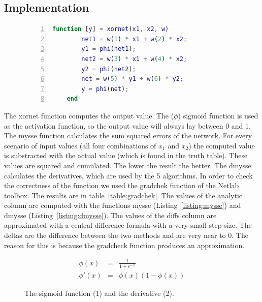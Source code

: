 \documentclass{article}
\begin{document}
\subsection{Implementation}
\begin{figure}[H]
	\begin{lstlisting}[caption={The computation of the output value, based on the input values and the weights.}, captionpos=b, language=matlab, numbers=left, tabsize=4, frame=single, basicstyle=\footnotesize]
	function [y] = xornet(x1, x2, w)
		net1 = w(1) * x1 + w(2) * x2;
	 	y1 = phi(net1);
		net2 = w(3) * x1 + w(4) * x2;
	 	y2 = phi(net2);
		net = w(5) * y1 + w(6) * y2;
	 	y = phi(net);
	end
	\end{lstlisting}
\end{figure}

The xornet function computes the output value. The ($\phi$) sigmoid function is used as the activation function, so the output value will always lay between 0 and 1. The mysse function calculates the sum squared errors of the network. For every scenario of input values (all four combinations of $x_1$ and $x_2$) the computed value is substracted with the actual value (which is found in the truth table). These values are squared and cumulated. The lower the result the better. The dmysse calculates the derivatives, which are used by the 5 algorithms. In order to check the correctness of the function we used the gradchek function of the Netlab toolbox. The results are in table~\ref{table:gradchek}. The values of the analytic column are computed with the functions mysse (Listing~\ref{listing:mysse}) and dmysse (Listing~\ref{listing:dmysse}). The values of the diffs column are approximated with a central difference formula with a very small step size. The deltas are the difference between the two methods and are very near to 0. The reason for this is because the gradcheck function produces an approximation. 

\begin{figure}[H]
	\centering
	\begin{eqnarray}
	 \phi(x) & = & \frac{1}{1 + e^{-x}} \\
	   \phi'(x) & = & \phi(x)(1 - \phi(x))
	\end{eqnarray}
	\caption{The sigmoid function (1) and the derivative (2).}
\end{figure}

\end{document}
